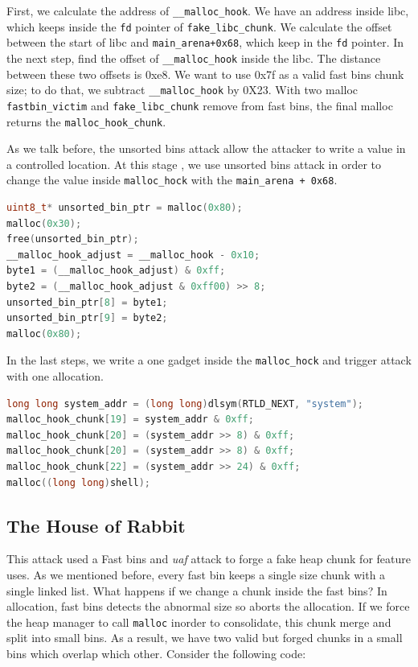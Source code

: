 \documentclass{masterthesis}
\newcommand*\fb{fast bins}
\newcommand*\ub{unsorted bins}
\newcommand*\sbs{small bins}
\newcommand*\Fb{Fast bins\xspace}
\newcommand*\mallocc{\lstinline{malloc}\xspace}
\begin{document}
First, we calculate the address of \lstinline{__malloc_hook}. We have an address inside libc, which keeps inside the \lstinline{fd} pointer of \lstinline{fake_libc_chunk}. We calculate the offset between the start of libc and \lstinline{main_arena+0x68}, which keep in the \lstinline{fd} pointer. In the next step, find the offset of \lstinline{__malloc_hook} inside the libc. The distance between these two offsets is 0xe8.
We want to use  0x7f as a valid \fb{} chunk size; to do that, we subtract \lstinline{__malloc_hook} by 0X23. With two malloc \lstinline{fastbin_victim} and \lstinline{fake_libc_chunk} remove from \fb{}, the final malloc returns the \lstinline{malloc_hook_chunk}.

As we talk before, the \ub{} attack allow the attacker to write a value in a controlled location. At this stage , we use \ub{} attack in order to change the value inside \lstinline{malloc_hock} with the \lstinline{main_arena + 0x68}. 
\begin{lstlisting}[language=c,frame=tlrb]
uint8_t* unsorted_bin_ptr = malloc(0x80);
malloc(0x30);
free(unsorted_bin_ptr);
__malloc_hook_adjust = __malloc_hook - 0x10;
byte1 = (__malloc_hook_adjust) & 0xff; 
byte2 = (__malloc_hook_adjust & 0xff00) >> 8; 
unsorted_bin_ptr[8] = byte1;
unsorted_bin_ptr[9] = byte2;
malloc(0x80);
\end{lstlisting}
In the last steps, we write a one gadget inside the \lstinline{malloc_hock} and trigger attack with one allocation.
\begin{lstlisting}[language=c,frame=tlrb]
long long system_addr = (long long)dlsym(RTLD_NEXT, "system");
malloc_hook_chunk[19] = system_addr & 0xff;
malloc_hook_chunk[20] = (system_addr >> 8) & 0xff;
malloc_hook_chunk[20] = (system_addr >> 8) & 0xff;
malloc_hook_chunk[22] = (system_addr >> 24) & 0xff;
malloc((long long)shell);
\end{lstlisting}
\subsection{The House of Rabbit}
\label{subsect:houserabbit}
This attack used a \Fb{} and \emph{uaf} attack to forge a fake heap chunk for feature uses. As we mentioned before, every fast bin keeps a single size chunk with a single linked list. What happens if we change a chunk inside the \fb{}? In allocation, \fb{} detects the abnormal size so aborts the allocation. If we force the heap manager to call \mallocc{} inorder to consolidate, this chunk merge and split into \sbs{}. As a result, we have two valid but forged chunks in a \sbs{} which overlap which other. Consider the following code:
\end{document}
